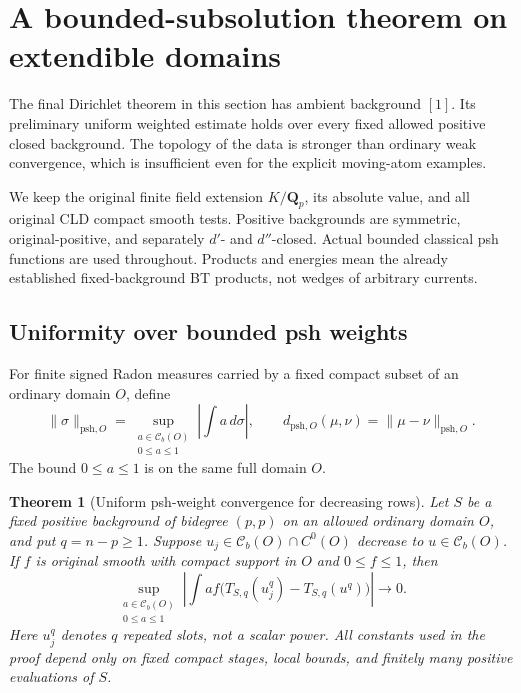 \documentclass[11pt,a4paper]{article}
\numberwithin{equation}{section}
\newtheorem{theorem}{Theorem}[section]
\theoremstyle{definition}
\theoremstyle{remark}
\begin{document}


\section{A bounded-subsolution theorem on extendible domains}
\label{sec:r3-bounded-subsolution}

The final Dirichlet theorem in this section has ambient background
$[1]$.  Its preliminary uniform weighted estimate holds over every
fixed allowed positive closed background.  The topology of the data
is stronger than ordinary weak convergence, which is insufficient
even for the explicit moving-atom examples.

We keep the original finite field extension $K/\mathbf Q_p$, its
absolute value, and all original CLD compact smooth tests.  Positive
backgrounds are symmetric, original-positive, and separately
$d'$- and $d''$-closed.  Actual bounded classical psh functions are
used throughout.  Products and energies mean the already established
fixed-background BT products, not wedges of arbitrary currents.

\subsection{Uniformity over bounded psh weights}

For finite signed Radon measures carried by a fixed compact subset
of an ordinary domain $O$, define
\[
 \|\sigma\|_{\mathrm{psh},O}
   =\sup_{\substack{a\in\mathcal C_b(O)\\0\leq a\leq1}}
                 \left|\int a\,d\sigma\right|,
 \qquad
 d_{\mathrm{psh},O}(\mu,\nu)=\|\mu-\nu\|_{\mathrm{psh},O}.
\]
The bound $0\leq a\leq1$ is on the same full domain $O$.

\begin{theorem}[Uniform psh-weight convergence for decreasing rows]
\label{thm:r3-psh-dual-monotone}
Let $S$ be a fixed positive background of bidegree $(p,p)$ on an
allowed ordinary domain $O$, and put $q=n-p\geq1$.  Suppose
$u_j\in\mathcal C_b(O)\cap C^0(O)$ decrease to
$u\in\mathcal C_b(O)$.  If $f$ is original smooth with compact
support in $O$ and $0\leq f\leq1$, then
\[
 \sup_{\substack{a\in\mathcal C_b(O)\\0\leq a\leq1}}
 \left|\int af\bigl(T_{S,q}(u_j^q)-T_{S,q}(u^q)\bigr)\right|
       \longrightarrow0.
\]
Here $u_j^q$ denotes $q$ repeated slots, not a scalar power.
All constants used in the proof depend only on fixed compact
stages, local bounds, and finitely many positive evaluations of $S$.
\end{theorem}
\end{document}

